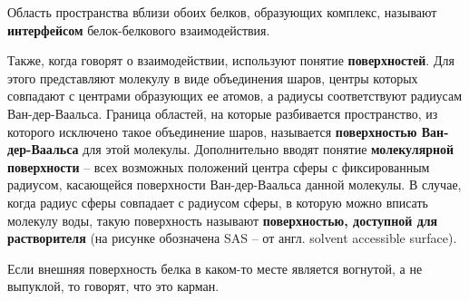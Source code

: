 
Область пространства вблизи обоих белков, образующих комплекс, называют \textbf{интерфейсом} белок-белкового взаимодействия. 

\begin{center}

\end{center}

Также, когда говорят о взаимодействии, используют понятие \textbf{поверхностей}. Для этого представляют молекулу в виде объединения шаров, центры которых совпадают с центрами образующих ее атомов, а радиусы соответствуют радиусам Ван-дер-Ваальса. Граница областей, на которые разбивается пространство, из которого исключено такое объединение шаров, называется \textbf{поверхностью Ван-дер-Ваальса} для этой молекулы. Дополнительно вводят понятие \textbf{молекулярной поверхности} -- всех возможных положений центра сферы с фиксированным радиусом, касающейся поверхности Ван-дер-Ваальса данной молекулы. В случае, когда радиус сферы совпадает с радиусом сферы, в которую можно вписать молекулу воды, такую поверхность называют \textbf{поверхностью, доступной для растворителя} (на рисунке обозначена SAS -- от англ. solvent accessible surface).

Если внешняя поверхность белка в каком-то месте является вогнутой, а не выпуклой, то говорят, что это карман. 




